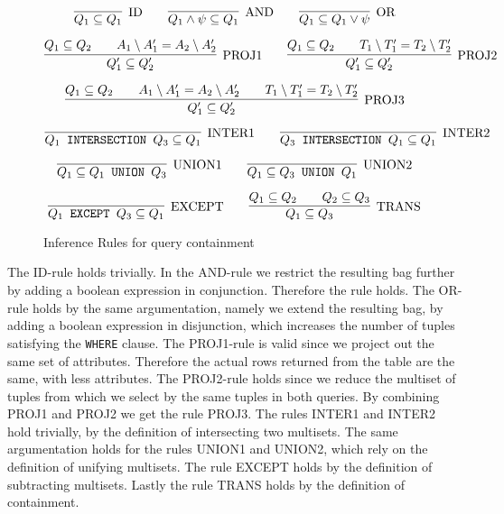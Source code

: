 \begin{figure}[!ht]
\[
\infer[\text{ID}]
	{Q_1 \subseteq Q_1}
	{}
\qquad	
\infer[\text{AND}]
	{Q_1 \land \psi \subseteq Q_1}
	{}
\qquad
\infer[\text{OR}]
	{Q_1 \subseteq Q_1 \lor \psi}
	{}
\]

\[
\infer[\text{PROJ1}]
	{Q_1' \subseteq Q_2'}
	{Q_1 \subseteq Q_2 \qquad A_1 \setminus A_1' = A_2 \setminus A_2'}
\qquad
\infer[\text{PROJ2}]
	{Q_1' \subseteq Q_2'}
	{Q_1 \subseteq Q_2 \qquad T_1 \setminus T_1' = T_2 \setminus T_2'}
\]

\[
\infer[\text{PROJ3}]
	{Q_1' \subseteq Q_2'}
	{Q_1 \subseteq Q_2 \qquad A_1 \setminus A_1' = A_2 \setminus A_2' \qquad T_1 \setminus T_1' = T_2 \setminus T_2'}
\]


\[
\infer[\text{INTER1}]
	{Q_1 \text{\texttt{ INTERSECTION }} Q_3 \subseteq Q_1}
	{}
\qquad
\infer[\text{INTER2}]
	{Q_3 \text{\texttt{ INTERSECTION }} Q_1 \subseteq Q_1}
	{}
\]

\[
\infer[\text{UNION1}]
	{Q_1 \subseteq Q_1 \text{\texttt{ UNION }} Q_3}
	{}
\qquad
\infer[\text{UNION2}]
	{Q_1 \subseteq Q_3 \text{\texttt{ UNION }} Q_1}
	{}
\]

\[
\infer[\text{EXCEPT}]
	{Q_1 \text{\texttt{ EXCEPT }} Q_3 \subseteq Q_1}
	{}
\qquad
\infer[\text{TRANS}]
	{Q_1 \subseteq Q_3}
	{Q_1 \subseteq Q_2 \qquad Q_2 \subseteq Q_3}
\]
\caption{Inference Rules for query containment}
\label{figure:algorithms:infrules}
\end{figure}


The ID-rule holds trivially.
%
In the AND-rule we restrict the resulting bag further by adding a boolean expression in conjunction. 
%
Therefore the rule holds.
%
The OR-rule holds by the same argumentation, namely we extend the resulting bag, by adding a boolean expression in disjunction,  which increases the number of tuples satisfying the \texttt{WHERE} clause. 
%
The PROJ1-rule is valid since we project out the same set of attributes. Therefore the actual rows returned from the table are the same, with less attributes.
%
%
The PROJ2-rule holds since we reduce the multiset of tuples from which we select by the same tuples in both queries.
%
By combining PROJ1 and PROJ2 we get the rule PROJ3.
%
The rules INTER1 and INTER2 hold trivially, by the definition of intersecting two multisets.
%
The same argumentation holds for the rules UNION1 and UNION2, which rely on the definition of unifying multisets.
%
The rule EXCEPT holds by the definition of subtracting multisets.
%
Lastly the rule TRANS holds by the definition of containment.

